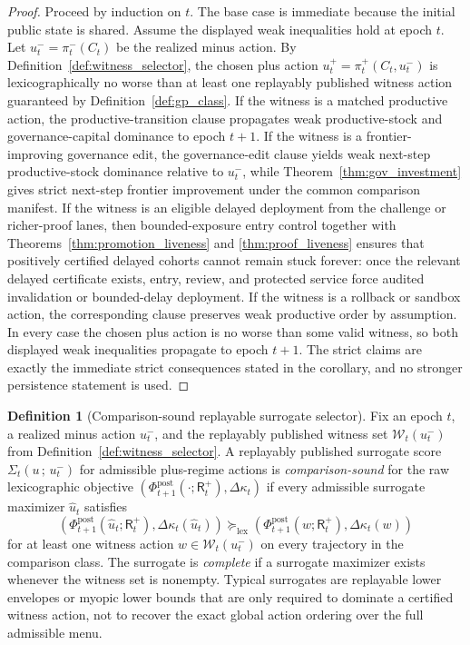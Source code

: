 \documentclass[11pt]{article}
\theoremstyle{definition}
\newtheorem{definition}[theorem]{Definition}
\newcommand{\1}{\mathbf{1}}
\begin{document}
\begin{proof}
Proceed by induction on $t$. The base case is immediate because the initial public state is shared. Assume the displayed weak inequalities hold at epoch $t$. Let $u_t^-=\pi_t^-(C_t)$ be the realized minus action. By Definition~\ref{def:witness_selector}, the chosen plus action $u_t^+=\pi_t^+(C_t,u_t^-)$ is lexicographically no worse than at least one replayably published witness action guaranteed by Definition~\ref{def:gp_class}. If the witness is a matched productive action, the productive-transition clause propagates weak productive-stock and governance-capital dominance to epoch $t+1$. If the witness is a frontier-improving governance edit, the governance-edit clause yields weak next-step productive-stock dominance relative to $u_t^-$, while Theorem~\ref{thm:gov_investment} gives strict next-step frontier improvement under the common comparison manifest. If the witness is an eligible delayed deployment from the challenge or richer-proof lanes, then bounded-exposure entry control together with Theorems~\ref{thm:promotion_liveness} and \ref{thm:proof_liveness} ensures that positively certified delayed cohorts cannot remain stuck forever: once the relevant delayed certificate exists, entry, review, and protected service force audited invalidation or bounded-delay deployment. If the witness is a rollback or sandbox action, the corresponding clause preserves weak productive order by assumption. In every case the chosen plus action is no worse than some valid witness, so both displayed weak inequalities propagate to epoch $t+1$. The strict claims are exactly the immediate strict consequences stated in the corollary, and no stronger persistence statement is used.
\end{proof}

\begin{definition}[Comparison-sound replayable surrogate selector]\label{def:surrogate_selector}
Fix an epoch $t$, a realized minus action $u_t^-$, and the replayably published witness set $\mathcal W_t(u_t^-)$ from Definition~\ref{def:witness_selector}. A replayably published surrogate score $\Sigma_t(u\,;\,u_t^-)$ for admissible plus-regime actions is \emph{comparison-sound} for the raw lexicographic objective $(\Phi_{t+1}^{\mathrm{post}}(\cdot;\mathsf R_t^+),\Delta\kappa_t)$ if every admissible surrogate maximizer $\hat u_t$ satisfies
\[
(\Phi_{t+1}^{\mathrm{post}}(\hat u_t;\mathsf R_t^+),\Delta\kappa_t(\hat u_t))\succcurlyeq_{\mathrm{lex}}
(\Phi_{t+1}^{\mathrm{post}}(w;\mathsf R_t^+),\Delta\kappa_t(w))
\]
for at least one witness action $w\in\mathcal W_t(u_t^-)$ on every trajectory in the comparison class. The surrogate is \emph{complete} if a surrogate maximizer exists whenever the witness set is nonempty. Typical surrogates are replayable lower envelopes or myopic lower bounds that are only required to dominate a certified witness action, not to recover the exact global action ordering over the full admissible menu.
\end{definition}
\end{document}
